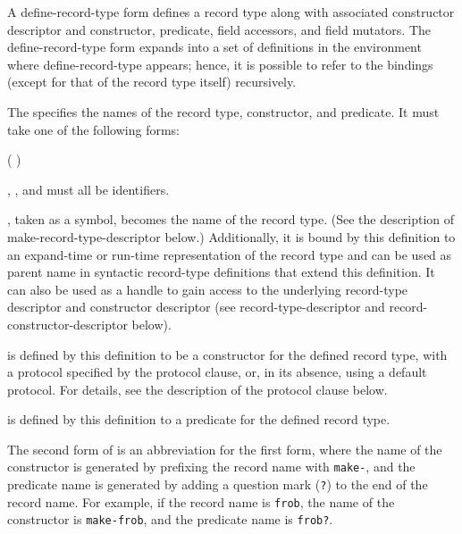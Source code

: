 \begin{entry}{%
}

A {\cf define-record-type} form defines a record type along with
associated constructor descriptor and constructor, predicate, field
accessors, and field mutators. The {\cf define-record-type} form expands into
a set of definitions in the environment where {\cf define-record-type}
appears; hence, it is possible to refer to the bindings (except for
that of the record type itself) recursively.

The  specifies the names of the record type,
constructor, and predicate. It must take one of the following
forms:

\begin{scheme}
(  )
%
\end{scheme}

, , and  must all be identifiers.

, taken as a symbol, becomes the name of the record
type. (See the description of {\cf make-record-type-descriptor}
below.)
Additionally, it is bound by this definition to an expand-time or run-time
representation of the record type and can be used as parent name in
syntactic record-type definitions that extend this definition. It can
also be used as a handle to gain access to the underlying record-type
descriptor and constructor descriptor (see {\cf
  record-type-descriptor} and {\cf record-constructor-descriptor}
below).

 is defined by this definition to be a
constructor for the defined record type, with a protocol specified by
the {\cf protocol} clause, or, in its absence, using a default protocol. For
details, see the description of the {\cf protocol} clause below.

 is defined by this definition to a predicate
for the defined record type.

The second form of  is an abbreviation for the first
form, where the name of the constructor is generated by prefixing the
record name with {\tt make-}, and the predicate name is generated by
adding a question mark ({\tt ?}) to the end of the record name. For
example, if the record name is {\tt frob}, the name of the
constructor is {\tt make-frob}, and the predicate name is
{\tt frob?}.


\end{entry}
